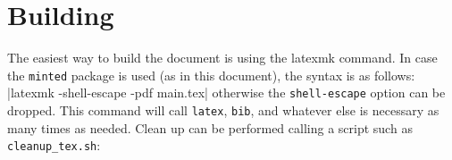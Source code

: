 
\section*{Building}

The easiest way to build the document is using the latexmk command. In case
the \texttt{minted} package is used (as in this document), the syntax is as
follows: |latexmk -shell-escape -pdf main.tex|
otherwise the \texttt{shell-escape} option can be dropped. This command will
call \texttt{latex}, \texttt{bib}, and whatever else is necessary as many
times as needed. Clean up can be performed calling a script such as
\texttt{cleanup\_tex.sh}:
\inputminted[bgcolor=lightgray]{bash}{cleanup_tex.sh}
